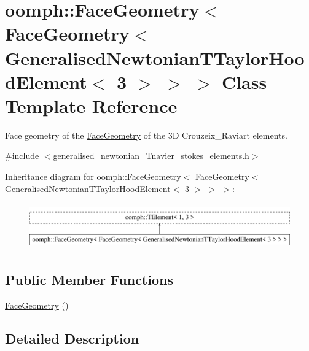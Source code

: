\hypertarget{classoomph_1_1FaceGeometry_3_01FaceGeometry_3_01GeneralisedNewtonianTTaylorHoodElement_3_013_01_4_01_4_01_4}{}\section{oomph\+:\+:Face\+Geometry$<$ Face\+Geometry$<$ Generalised\+Newtonian\+T\+Taylor\+Hood\+Element$<$ 3 $>$ $>$ $>$ Class Template Reference}
\label{classoomph_1_1FaceGeometry_3_01FaceGeometry_3_01GeneralisedNewtonianTTaylorHoodElement_3_013_01_4_01_4_01_4}


Face geometry of the \hyperlink{classoomph_1_1FaceGeometry}{Face\+Geometry} of the 3D Crouzeix\+\_\+\+Raviart elements.  




{\ttfamily \#include $<$generalised\+\_\+newtonian\+\_\+\+Tnavier\+\_\+stokes\+\_\+elements.\+h$>$}

Inheritance diagram for oomph\+:\+:Face\+Geometry$<$ Face\+Geometry$<$ Generalised\+Newtonian\+T\+Taylor\+Hood\+Element$<$ 3 $>$ $>$ $>$\+:\begin{figure}[H]
\begin{center}
\leavevmode
\includegraphics[height=2.000000cm]{classoomph_1_1FaceGeometry_3_01FaceGeometry_3_01GeneralisedNewtonianTTaylorHoodElement_3_013_01_4_01_4_01_4}
\end{center}
\end{figure}
\subsection*{Public Member Functions}
\begin{DoxyCompactItemize}
\item 
\hyperlink{classoomph_1_1FaceGeometry_3_01FaceGeometry_3_01GeneralisedNewtonianTTaylorHoodElement_3_013_01_4_01_4_01_4_a9945d4b7f2c9bc4d2ac5166bc30eb69d}{Face\+Geometry} ()
\end{DoxyCompactItemize}


\subsection{Detailed Description}
